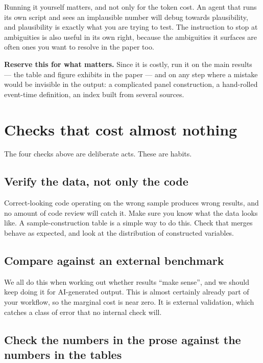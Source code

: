 \documentclass[11pt,a4paper]{article}
\begin{document}
Running it yourself matters, and not only for the token cost. An agent that runs its own
script and sees an implausible number will debug towards plausibility, and
plausibility is exactly what you are trying to test. The
instruction to stop at ambiguities is also useful in its own right, because the
ambiguities it surfaces are often ones you want to resolve in the paper too.

\begin{aside}
\textbf{Reserve this for what matters.} Since it is costly, run it on the main
results --- the table and figure exhibits in the paper --- and on any step where a
mistake would be invisible in the output: a complicated panel construction, a
hand-rolled event-time definition, an index built from several sources.
\end{aside}

\section{Checks that cost almost nothing}
\label{sec:habits}

The four checks above are deliberate acts. These are habits.

\subsection{Verify the data, not only the code}

Correct-looking code operating on the wrong sample produces wrong results, and no
amount of code review will catch it. Make sure you know what the data looks like.
A sample-construction table is a simple way to do this. Check that merges behave
as expected, and look at the distribution of constructed variables.

\subsection{Compare against an external benchmark}

We all do this when working out whether results ``make sense'', and we should keep
doing it for AI-generated output. This is almost certainly already part of your
workflow, so the marginal cost is near zero. It is external validation, which
catches a class of error that no internal check will.

\subsection{Check the numbers in the prose against the numbers in the tables}
\end{document}
